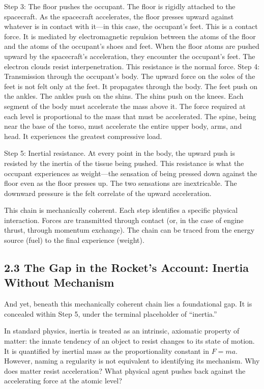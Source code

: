 \documentclass[11pt]{article}
\begin{document}
Step 3: The floor pushes the occupant. The floor is rigidly attached to the spacecraft. As the spacecraft accelerates, the floor presses upward against whatever is in contact with it---in this case, the occupant's feet. This is a contact force. It is mediated by electromagnetic repulsion between the atoms of the floor and the atoms of the occupant's shoes and feet. When the floor atoms are pushed upward by the spacecraft's acceleration, they encounter the occupant's feet. The electron clouds resist interpenetration. This resistance is the normal force. Step 4: Transmission through the occupant's body. The upward force on the soles of the feet is not felt only at the feet. It propagates through the body. The feet push on the ankles. The ankles push on the shins. The shins push on the knees. Each segment of the body must accelerate the mass above it. The force required at each level is proportional to the mass that must be accelerated. The spine, being near the base of the torso, must accelerate the entire upper body, arms, and head. It experiences the greatest compressive load.

Step 5: Inertial resistance. At every point in the body, the upward push is resisted by the inertia of the tissue being pushed. This resistance is what the occupant experiences as weight---the sensation of being pressed down against the floor even as the floor presses up. The two sensations are inextricable. The downward pressure is the felt correlate of the upward acceleration.

This chain is mechanically coherent. Each step identifies a specific physical interaction. Forces are transmitted through contact (or, in the case of engine thrust, through momentum exchange). The chain can be traced from the energy source (fuel) to the final experience (weight).

\subsection{2.3 The Gap in the Rocket's Account: Inertia Without Mechanism}

And yet, beneath this mechanically coherent chain lies a foundational gap. It is concealed within Step 5, under the terminal placeholder of ``inertia.''

In standard physics, inertia is treated as an intrinsic, axiomatic property of matter: the innate tendency of an object to resist changes to its state of motion. It is quantified by inertial mass as the proportionality constant in \(F = ma\). However, naming a regularity is not equivalent to identifying its mechanism. Why does matter resist acceleration? What physical agent pushes back against the accelerating force at the atomic level?
\end{document}
